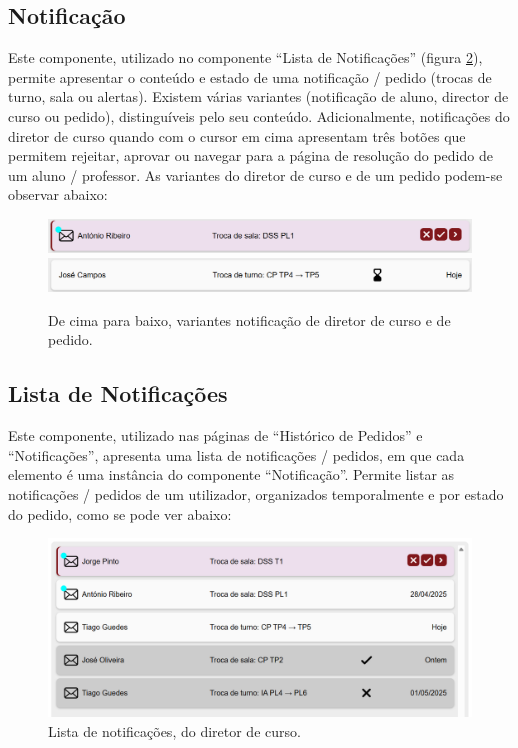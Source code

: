\documentclass[12pt, a4paper]{article}
\begin{document}
\subsection{Notificação}

Este componente, utilizado no componente ``Lista de Notificações''
(figura \ref{notifications-list}), permite apresentar o conteúdo e estado
de uma notificação / pedido (trocas de turno, sala ou alertas).
Existem várias variantes (notificação de aluno, director de curso ou pedido), distinguíveis pelo
seu conteúdo. Adicionalmente, notificações do diretor de curso quando com o cursor em cima
apresentam três botões que permitem rejeitar, aprovar ou navegar para a página de resolução do
pedido de um aluno / professor. As variantes do diretor de curso e de um pedido podem-se
observar abaixo:


\begin{figure}[H]
    \centering
    \includegraphics[width=\textwidth]{res/components/director-notification.png}
    \includegraphics[width=\textwidth]{res/components/student-request.png}
    \caption{De cima para baixo, variantes notificação de diretor de curso e de pedido.}
    \label{notification}
\end{figure}

\subsection{Lista de Notificações}

Este componente, utilizado nas páginas de ``Histórico de Pedidos'' e ``Notificações'',
apresenta uma lista de notificações / pedidos, em que cada elemento é uma instância do componente
``Notificação''. Permite listar as notificações / pedidos de um utilizador, organizados
temporalmente e por estado do pedido, como se pode ver abaixo:


\begin{figure}[H]
    \centering
    \includegraphics[width=\textwidth]{res/components/director-notifications-list.png}
    \caption{Lista de notificações, do diretor de curso.}
    \label{notifications-list}
\end{figure}
\end{document}

